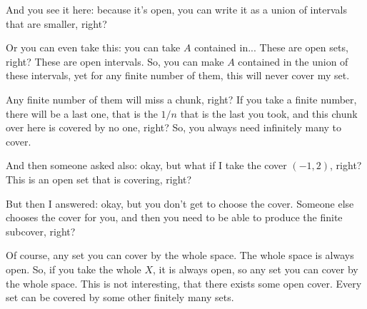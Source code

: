 \begin{speech}[01:09:14 - 01:11:26]
And you see it here: because it's open, you can write it as a union of intervals that are smaller, right?

Or you can even take this: you can take $A$ contained in...  These are open sets, right? These are open intervals. So, you can make $A$ contained in the union of these intervals, yet for any finite number of them, this will never cover my set. 

Any finite number of them will miss a chunk, right? If you take a finite number, there will be a last one, that is the $1/n$ that is the last you took, and this chunk over here is covered by no one, right? So, you always need infinitely many to cover.

And then someone asked also: okay, but what if I take the cover $(-1, 2)$, right?  This is an open set that is covering, right?

But then I answered: okay, but you don't get to choose the cover. Someone else chooses the cover for you, and then you need to be able to produce the finite subcover, right?

Of course, any set you can cover by the whole space. The whole space is always open. So, if you take the whole $X$, it is always open, so any set you can cover by the whole space. This is not interesting, that there exists some open cover. Every set can be covered by some other finitely many sets.
\end{speech}

